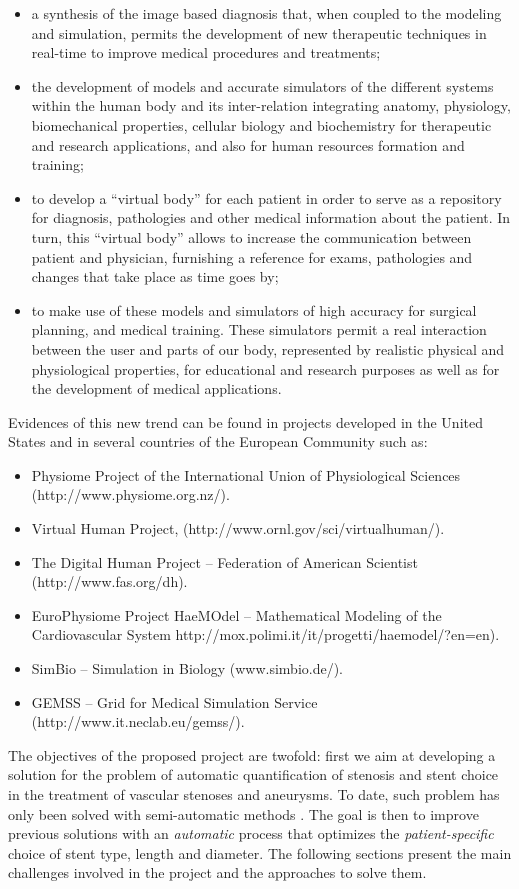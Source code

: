 \begin{itemize}
\item a synthesis of the image based diagnosis that, when coupled to the modeling and simulation, permits the development of new therapeutic techniques in real-time to improve medical procedures and treatments;
\item the development of models and accurate simulators of the different systems within the human body and its inter-relation integrating anatomy, physiology, biomechanical properties, cellular biology and biochemistry for therapeutic and research applications, and also for human resources formation and training;
\item to develop a “virtual body” for each patient in order to serve as a repository for diagnosis, pathologies and other medical information about the patient. In turn, this “virtual body” allows to increase the communication between patient and physician, furnishing a reference for exams, pathologies and changes that take place as time goes by;
\item to make use of these models and simulators of high accuracy for surgical planning, and medical training. These simulators permit a real interaction between the user and parts of our body, represented by realistic physical and physiological properties, for educational and research purposes as well as for the development of medical applications.
\end{itemize}


Evidences of this new trend can be found in projects developed in the United States and in several countries of the European Community such as:

\begin{itemize}
\item Physiome Project of the International Union of Physiological Sciences (http://www.physiome.org.nz/).
\item Virtual Human Project, (http://www.ornl.gov/sci/virtualhuman/).
\item The Digital Human Project – Federation of American Scientist (http://www.fas.org/dh).
\item EuroPhysiome Project HaeMOdel – Mathematical Modeling of the Cardiovascular System http://mox.polimi.it/it/progetti/haemodel/?en=en).
\item SimBio – Simulation in Biology (www.simbio.de/).
\item GEMSS – Grid for Medical Simulation Service (http://www.it.neclab.eu/gemss/).
\end{itemize}



The objectives of the proposed project are twofold: first we aim at developing a solution for the problem of automatic quantification of stenosis and stent choice in the treatment of vascular stenoses and aneurysms. To date, such problem has only been solved with semi-automatic methods \citep{Gremse01092011,Scherl200721,HERN-06b,Bemmel}. The goal is then to improve previous solutions with an {\em automatic} process that optimizes the {\em patient-specific} choice of stent type, length and diameter. The following sections present the main challenges involved in the project and the approaches to solve them. 



